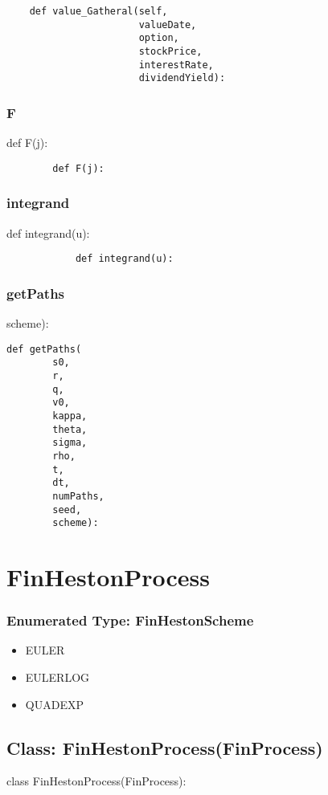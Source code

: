 \documentclass[twoside,11pt]{book}
\begin{document}
\begin{lstlisting}
    def value_Gatheral(self,
                       valueDate,
                       option,
                       stockPrice,
                       interestRate,
                       dividendYield):
\end{lstlisting}

\subsubsection*{{\bf F}}
def F(j): 

\begin{lstlisting}
        def F(j):
\end{lstlisting}

\subsubsection*{{\bf integrand}}
def integrand(u): 

\begin{lstlisting}
            def integrand(u):
\end{lstlisting}

\subsubsection*{{\bf getPaths}}
scheme): 

\begin{lstlisting}
def getPaths(
        s0,
        r,
        q,
        v0,
        kappa,
        theta,
        sigma,
        rho,
        t,
        dt,
        numPaths,
        seed,
        scheme):
\end{lstlisting}

\newpage
\section{FinHestonProcess}

\subsubsection{Enumerated Type: FinHestonScheme}
\begin{itemize}
\item{EULER}
\item{EULERLOG}
\item{QUADEXP}
\end{itemize}

\subsection*{Class: FinHestonProcess(FinProcess)}
class FinHestonProcess(FinProcess): 
\end{document}
